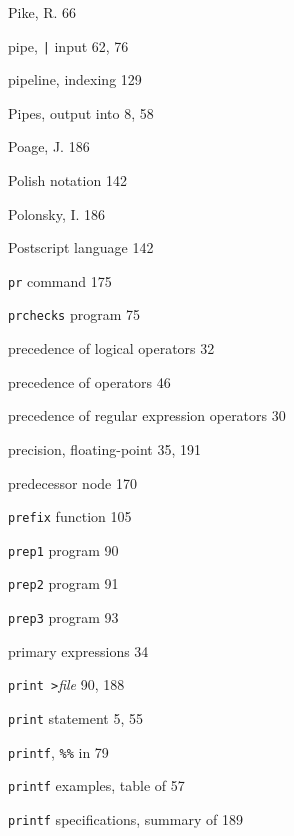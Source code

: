 \begin{multicols}{3}
Pike, R. 66

pipe, \verb'|' input 62, 76

pipeline, indexing 129

Pipes, output into 8, 58

Poage, J. 186

Polish notation 142

Polonsky, I. 186

Postscript language 142

\verb'pr' command 175

\verb'prchecks' program 75

precedence of logical operators 32

precedence of operators 46

precedence of regular expression operators 30

precision, floating-point 35, 191

predecessor node 170

\verb'prefix' function 105

\verb'prep1' program 90

\verb'prep2' program 91

\verb'prep3' program 93

primary expressions 34

\verb'print >'\textit{file} 90, 188

\verb'print' statement 5, 55

\verb'printf', \verb'%%' in 79

\verb'printf' examples, table of 57

\verb'printf' specifications, summary of 189

\end{multicols}
